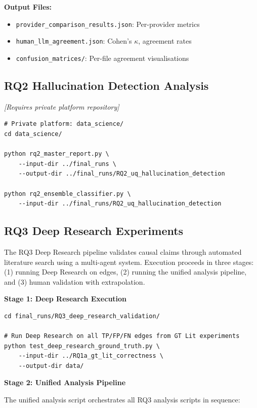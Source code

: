 \textbf{Output Files:}
\begin{itemize}[noitemsep]
    \item \texttt{provider\_comparison\_results.json}: Per-provider metrics
    \item \texttt{human\_llm\_agreement.json}: Cohen's $\kappa$, agreement rates
    \item \texttt{confusion\_matrices/}: Per-file agreement visualisations
\end{itemize}

\subsection{RQ2 Hallucination Detection Analysis}
\label{sec:rq2_execution}

\noindent\textit{[Requires private platform repository]}

\begin{verbatim}
# Private platform: data_science/
cd data_science/

python rq2_master_report.py \
    --input-dir ../final_runs \
    --output-dir ../final_runs/RQ2_uq_hallucination_detection

python rq2_ensemble_classifier.py \
    --input-dir ../final_runs/RQ2_uq_hallucination_detection
\end{verbatim}

\subsection{RQ3 Deep Research Experiments}
\label{sec:rq3_execution}

The RQ3 Deep Research pipeline validates causal claims through automated literature search using a multi-agent system. Execution proceeds in three stages: (1) running Deep Research on edges, (2) running the unified analysis pipeline, and (3) human validation with extrapolation.

\textbf{Stage 1: Deep Research Execution}

\begin{verbatim}
cd final_runs/RQ3_deep_research_validation/

# Run Deep Research on all TP/FP/FN edges from GT Lit experiments
python test_deep_research_ground_truth.py \
    --input-dir ../RQ1a_gt_lit_correctness \
    --output-dir data/
\end{verbatim}

\textbf{Stage 2: Unified Analysis Pipeline}

The unified analysis script orchestrates all RQ3 analysis scripts in sequence:

